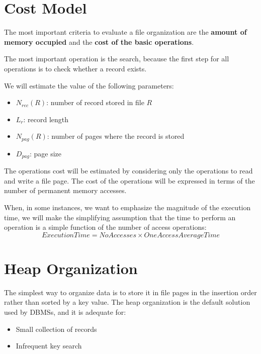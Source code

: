 \section{Cost Model}
The most important criteria to evaluate a file organization are the \textbf{amount of memory occupied} and the \textbf{cost of the basic operations}.
\begin{tcolorbox}
The most important operation is the search, because the first step for all operations is to check whether a record exists.
\end{tcolorbox}
We will estimate the value of the following parameters:
\begin{itemize}
    \item \(N_{rec}(R)\): number of record stored in file \(R\)
    \item \(L_r\): record length
    \item \(N_{pag}(R)\): number of pages where the record is stored
    \item \(D_{pag}\): page size
\end{itemize}
The operations cost will be estimated by considering only the operations to read and write a file page. The cost of the operations will be expressed in terms of the number of permanent memory accesses.

When, in some instances, we want to emphasize the magnitude of the execution time, we will make the simplifying assumption that the time to perform an operation is a simple function of the number of access operations:
\[ExecutionTime = NoAccesses \times OneAccessAverageTime\]

\section{Heap Organization}
\begin{tcolorbox}
The simplest way to organize data is to store it in file pages in the insertion order rather than sorted by a key value. The heap organization is the default solution used by DBMSs, and it is adequate for:
\begin{itemize}
    \item Small collection of records
    \item Infrequent key search 
\end{itemize}
\end{tcolorbox}


